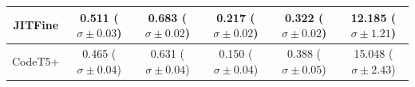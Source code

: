 \documentclass[11pt]{article}
\begin{document}
\begin{table}[htbp]
{\begin{tabular}{|c|c|c|c|c|c|}
JITFine & \makecell{0.511\\ ($\sigma \pm 0.03$)} & \makecell{0.683\\ ($\sigma \pm 0.02$)} & \makecell{0.217\\ ($\sigma \pm 0.02$)} & \makecell{0.322\\ ($\sigma \pm 0.02$)} & \makecell{12.185\\ ($\sigma \pm 1.21$)} \\\hline
CodeT5+ & \makecell{0.465\\ ($\sigma \pm 0.04$)} & \makecell{0.631\\ ($\sigma \pm 0.04$)} & \makecell{0.150\\ ($\sigma \pm 0.04$)} & \makecell{0.388\\ ($\sigma \pm 0.05$)} & \makecell{15.048\\ ($\sigma \pm 2.43$)} \\\hline
\end{tabular}
}
\end{table}
\end{document}
